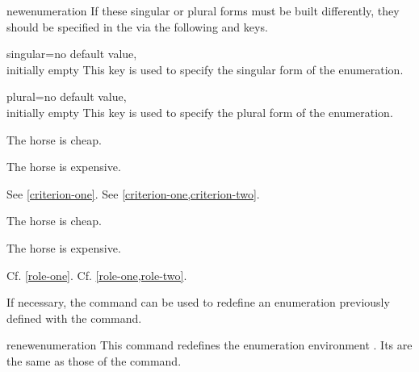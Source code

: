 \documentclass[english,nolocaltoc]{nwejmart}
\newtheorem[style=definition]{fact}
\newtheorem[title=experience]{experience}
\newtheorem[title-plural=rings]{ring}
\newtheorem[title=ideal,title-plural=ideals]{ideal}
\begin{document}
\begin{docCommand}[doc new=2019-03-18]{newenumeration}{}
If these singular or plural forms must be built differently,  they
should be specified in the  via
the following  and  keys.
  \begin{docKey}{singular}{={}}{no default value,\\initially empty}
    This key is used to specify the singular form of the enumeration.
  \end{docKey}
  \begin{docKey}{plural}{={}}{no default value,\\initially empty}
    This key is used to specify the plural form of the enumeration.
  \end{docKey}
\begin{preamblecode}
\end{preamblecode}
\begin{bodycode}[listing and text,listing options={deletekeywords={[2]label}}]
\begin{criteria}
\item\label{criterion-one} The horse is cheap.
\item\label{criterion-two} The horse is expensive.
\end{criteria}
See \vref{criterion-one}. See \vref{criterion-one,criterion-two}.
\end{bodycode}

\begin{preamblecode}
\end{preamblecode}
\begin{bodycode}[listing and text,listing options={deletekeywords={[2]label}}]
\begin{roles}
\item\label{role-one} The horse is cheap.
\item\label{role-two} The horse is expensive.
\end{roles}
Cf. \vref{role-one}. Cf. \vref{role-one,role-two}.
\end{bodycode}
%
\end{docCommand}

If necessary, the  command can be used to
redefine an enumeration previously defined with the
 command.

\begin{docCommand}[doc new=2019-03-18]{renewenumeration}{}
  This command redefines the enumeration environment . Its
   are the same as those of the 
   command.
\end{docCommand}
\end{document}
